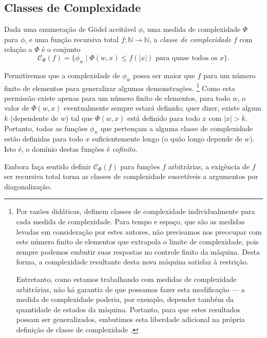\subsection{Classes de Complexidade}

\begin{definition}\cite[p.~242]{Kozen2006}
    Dada uma enumeração de Gödel aceitável $\phi$,
    uma medida de complexidade $\Phi$ para $\phi$,
    e uma função recursiva total
    $f: \mathbb N \rightarrow \mathbb N$,
    a \emph{classe de complexidade $f$} com relação a $\Phi$
    é o conjunto
    \begin{equation*}
        \mathcal C_\Phi(f) = \{ \phi_w \mid \Phi(w, x) \leq f(|x|)
            \text{ para quase todos os $x$}
        \}.
    \end{equation*}
\end{definition}
Permitiremos que a complexidade de $\phi_w$
possa ser maior que $f$ para um número finito de elementos
para generalizar algumas demonstrações.%
\footnote{
    Por razões didáticas, 
    definem classes de complexidade individualmente para cada medida de complexidade.
    Para tempo e espaço,
    que são as medidas levadas em consideração por estes autores,
    não precisamos nos preocupar com este número finito de elementos
    que extrapola o limite de complexidade,
    pois sempre podemos embutir suas respostas no controle finito da máquina.
    Desta forma,
    a complexidade resultante desta nova máquina satisfaz à restrição.

    Entretanto, como estamos trabalhando com medidas de complexidade arbitrárias,
    não há garantia de que possamos fazer esta modificação
    --- a medida de complexidade poderia, por exemplo,
    depender também da quantidade de estados da máquina.
    Portanto, para que estes resultados possam ser generalizados,
    embutimos esta liberdade adicional
    na própria definição de classe de complexidade
    \cite[p.~80]{McCreightMeyer1969}.
}
Como esta permissão existe apenas para um número finito de elementos,
para todo $w$, o valor de $\Phi(w, x)$ eventualmente sempre estará definido;
quer dizer, existe algum $k$ (dependente de $w$)
tal que $\Phi(w, x)$ está definido para todo $x$ com $|x| > k$.
Portanto,
todas as funções $\phi_w$ que pertençam a alguma classe de complexidade
estão definidas para todo $x$ suficientemente longo
(o quão longo depende de $w$).
Isto é, o domínio destas funções é \emph{cofinito}.

Embora faça sentido definir $\mathcal C_\Phi(f)$
para funções $f$ arbitrárias,
a exigência de $f$ ser recursiva total
torna as classes de complexidade
suscetíveis a argumentos por diagonalização.

